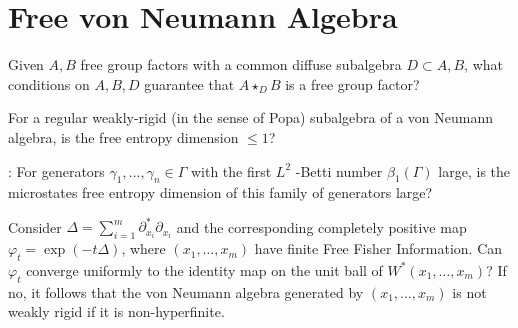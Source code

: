 \documentclass[12pt,letterpaper, reqno]{amsart}
\begin{document}
\section{Free von Neumann Algebra}

\begin{problem}
Given $A,B$ free group factors with a
common diffuse subalgebra $D\subset A,B$, what conditions on $A,B,D$
guarantee that $A\mathop{\star}_{D}B$ is a free group factor?\end{problem}

\begin{problem}
For a regular weakly-rigid (in the sense of
Popa) subalgebra of a von Neumann algebra, is the free entropy dimension
$\leq1$?
\end{problem}

\begin{problemblock}
\begin{problem}
\textbf{}: For generators $\gamma_{1},\ldots,\gamma_{n}\in\Gamma$
with the first $L^{2}$ -Betti number $\beta_{1}(\Gamma)$ large,
is the microstates free entropy dimension of this family of generators
large?
\end{problem}

\begin{comment}This is known for the non-microstates free entropy dimension
[work of Mineyev-Shlyakhtenko]
\end{comment}
\end{problemblock}

\begin{problem}
 Consider $\Delta=\sum_{i=1}^{m}\partial_{x_{i}}^{*}\partial_{x_{i}}$
and the corresponding completely positive map $\varphi_{t}=\exp(-t\Delta)$,
where $(x_{1},\ldots,x_{m})$ have finite Free Fisher Information.
Can $\varphi_{t}$ converge uniformly to the identity map on the unit
ball of $W^{*}(x_{1},\ldots,x_{m})$? If no, it follows that the von
Neumann algebra generated by $(x_{1},\ldots,x_{m})$ is not weakly
rigid if it is non-hyperfinite.
\end{problem}

\end{document}
